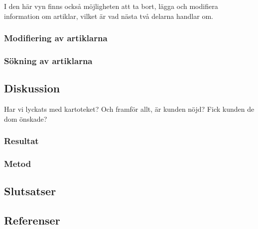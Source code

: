 I den här vyn finns också möjligheten att ta bort, lägga och modifiera
information om artiklar, vilket är vad nästa två delarna handlar om.

\clearpage
\subsubsection{Modifiering av artiklarna}


\subsubsection{Sökning av artiklarna}



\subsection{Diskussion}
Har vi lyckats med kartoteket? Och framför allt, är
kunden nöjd? Fick kunden de dom önskade?

\subsubsection{Resultat}


\subsubsection{Metod}


\subsection{Slutsatser}


\subsection{Referenser}
\vspace{-9mm}
\renewcommand{\refname}{}
\begin{thebibliography}{9}

\end{thebibliography}
